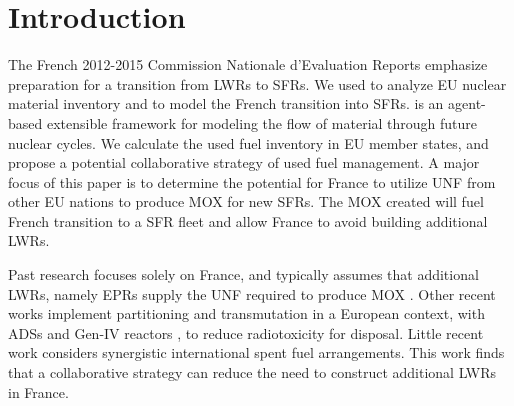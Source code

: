 
\section{Introduction}
The French 2012-2015 Commission Nationale d'Evaluation Reports
\cite{cne2_reports_2015} emphasize preparation for a transition from \glspl{LWR} to \glspl{SFR}.
We used \Cyclus \cite{huff_fundamental_2016} to analyze
 \gls{EU} nuclear material inventory and to model the French transition into
 \glspl{SFR}. \Cyclus is an agent-based extensible
framework for modeling the flow of material through future nuclear cycles.
We calculate the used fuel
inventory in \gls{EU} member states, and propose a potential collaborative
strategy of used fuel management.
A major focus of this paper is to determine the potential for France to utilize
\gls{UNF} from other \gls{EU} nations to produce \gls{MOX} for new \glspl{SFR}.
The \gls{MOX} created will fuel French transition to a \gls{SFR} fleet
and allow France to avoid building additional \glspl{LWR}.

Past research focuses solely on France, and typically assumes that additional \glspl{LWR},
namely \glspl{EPR} supply the \gls{UNF} required to produce \gls{MOX} \cite{carre_overview_2009, martin_symbiotic_2017, freynet_multiobjective_2016}.
Other recent works implement partitioning and transmutation
in a European context, with \glspl{ADS} and Gen-IV reactors \cite{fazio_study_2013},
to reduce radiotoxicity for disposal.
Little recent work considers synergistic international spent fuel arrangements.
This work finds that a collaborative strategy can reduce the
need to construct additional \glspl{LWR} in France.
